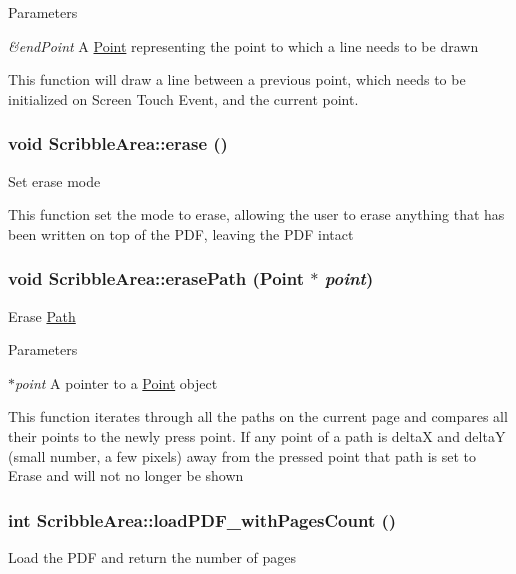 \begin{DoxyParams}{Parameters}
\item[{\em \&endPoint}]A \hyperlink{classPoint}{Point} representing the point to which a line needs to be drawn\end{DoxyParams}
This function will draw a line between a previous point, which needs to be initialized on Screen Touch Event, and the current point. \hypertarget{classScribbleArea_a33796ff14c3f79bb51e1a19e74ffc384}{
\subsubsection[{erase}]{\setlength{\rightskip}{0pt plus 5cm}void ScribbleArea::erase ()}}
\label{classScribbleArea_a33796ff14c3f79bb51e1a19e74ffc384}
Set erase mode

This function set the mode to erase, allowing the user to erase anything that has been written on top of the PDF, leaving the PDF intact \hypertarget{classScribbleArea_acab809a6b738076b7011373b4230cc36}{
\subsubsection[{erasePath}]{\setlength{\rightskip}{0pt plus 5cm}void ScribbleArea::erasePath ({\bf Point} $\ast$ {\em point})}}
\label{classScribbleArea_acab809a6b738076b7011373b4230cc36}
Erase \hyperlink{classPath}{Path}


\begin{DoxyParams}{Parameters}
\item[{\em $\ast$point}]A pointer to a \hyperlink{classPoint}{Point} object\end{DoxyParams}
This function iterates through all the paths on the current page and compares all their points to the newly press point. If any point of a path is deltaX and deltaY (small number, a few pixels) away from the pressed point that path is set to Erase and will not no longer be shown \hypertarget{classScribbleArea_a96f69face188f2138752600dd7ed0946}{
\subsubsection[{loadPDF\_\-withPagesCount}]{\setlength{\rightskip}{0pt plus 5cm}int ScribbleArea::loadPDF\_\-withPagesCount ()}}
\label{classScribbleArea_a96f69face188f2138752600dd7ed0946}
Load the PDF and return the number of pages

